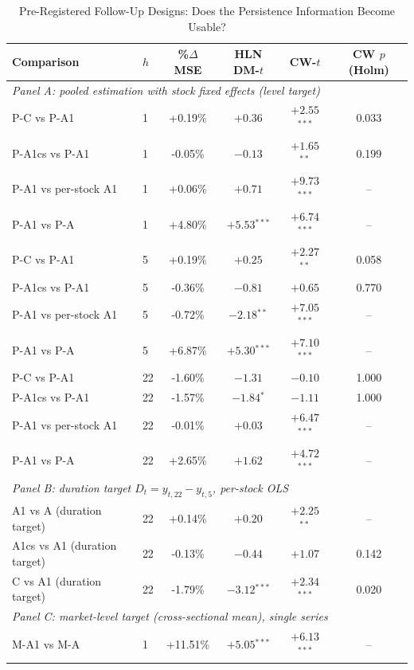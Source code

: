 
\begin{table}[htbp]
\centering
\caption{Pre-Registered Follow-Up Designs: Does the Persistence Information Become Usable?}
\label{tab:candidates}
\small
\begin{tabular}{llcccc}
\toprule
Comparison & $h$ & \%$\Delta$MSE & HLN DM-$t$ & CW-$t$ & CW $p$ (Holm) \\
\midrule
\multicolumn{6}{l}{\textit{Panel A: pooled estimation with stock fixed effects (level target)}} \\
P-C vs P-A1 & 1 & +0.19\% & $+0.36$ & $+2.55$$^{***}$ & 0.033 \\
P-A1cs vs P-A1 & 1 & -0.05\% & $-0.13$ & $+1.65$$^{**}$ & 0.199 \\
P-A1 vs per-stock A1 & 1 & +0.06\% & $+0.71$ & $+9.73$$^{***}$ & -- \\
P-A1 vs P-A & 1 & +4.80\% & $+5.53$$^{***}$ & $+6.74$$^{***}$ & -- \\
P-C vs P-A1 & 5 & +0.19\% & $+0.25$ & $+2.27$$^{**}$ & 0.058 \\
P-A1cs vs P-A1 & 5 & -0.36\% & $-0.81$ & $+0.65$ & 0.770 \\
P-A1 vs per-stock A1 & 5 & -0.72\% & $-2.18$$^{**}$ & $+7.05$$^{***}$ & -- \\
P-A1 vs P-A & 5 & +6.87\% & $+5.30$$^{***}$ & $+7.10$$^{***}$ & -- \\
P-C vs P-A1 & 22 & -1.60\% & $-1.31$ & $-0.10$ & 1.000 \\
P-A1cs vs P-A1 & 22 & -1.57\% & $-1.84$$^{*}$ & $-1.11$ & 1.000 \\
P-A1 vs per-stock A1 & 22 & -0.01\% & $+0.03$ & $+6.47$$^{***}$ & -- \\
P-A1 vs P-A & 22 & +2.65\% & $+1.62$ & $+4.72$$^{***}$ & -- \\
\midrule
\multicolumn{6}{l}{\textit{Panel B: duration target $D_t=y_{t,22}-y_{t,5}$, per-stock OLS}} \\
A1 vs A (duration target) & 22 & +0.14\% & $+0.20$ & $+2.25$$^{**}$ & -- \\
A1cs vs A1 (duration target) & 22 & -0.13\% & $-0.44$ & $+1.07$ & 0.142 \\
C vs A1 (duration target) & 22 & -1.79\% & $-3.12$$^{***}$ & $+2.34$$^{***}$ & 0.020 \\
\midrule
\multicolumn{6}{l}{\textit{Panel C: market-level target (cross-sectional mean), single series}} \\
M-A1 vs M-A & 1 & +11.51\% & $+5.05$$^{***}$ & $+6.13$$^{***}$ & -- \\

\end{tabular}
\end{table}
